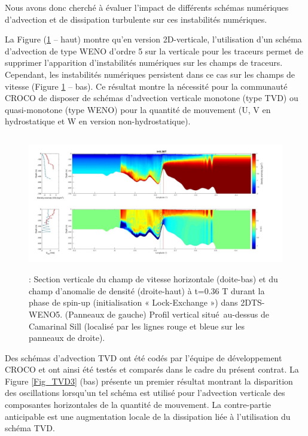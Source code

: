 Nous avons donc cherché à évaluer l'impact de différents schémas numériques d’advection et de dissipation turbulente sur ces instabilités numériques. 

\noindent La Figure (\ref{Fig_TVD2} – haut) montre qu'en version 2D-verticale, l’utilisation d’un schéma d’advection de type WENO d’ordre 5 sur la verticale pour les traceurs permet de supprimer l’apparition d’instabilités numériques sur les champs de traceurs. Cependant, les instabilités numériques persistent dans ce cas sur les champs de vitesse (Figure \ref{Fig_TVD2} – bas). Ce résultat montre la nécessité pour la communauté CROCO de disposer de schémas d’advection verticale monotone (type TVD) ou quasi-monotone (type WENO) pour la quantité de mouvement (U, V en hydrostatique et W en version non-hydrostatique). 

\begin{figure}[!h]
	\begin{Center}
		\includegraphics[width=4.98in,height=2.35in]{./media/TVD2.jpeg}
		\caption{ : Section verticale du champ de vitesse horizontale (doite-bas) et du champ d’anomalie de densité (droite-haut) à t=0.36 T durant la phase de spin-up (initialisation « Lock-Exchange ») dans 2DTS-WENO5. (Panneaux de gauche) Profil vertical situé\  au-dessus de Camarinal Sill (localisé par les lignes rouge et bleue sur les panneaux de droite).}
		\label{Fig_TVD2}
	\end{Center}
\end{figure}

\noindent Des schémas d’advection TVD ont été codés par l'équipe de développement CROCO et ont ainsi été testés et comparés dans le cadre du présent contrat. La Figure \ref{Fig_TVD3} (bas) présente un premier résultat montrant la disparition des oscillations lorsqu’un tel schéma est utilisé pour l’advection verticale des composantes horizontales de la quantité de mouvement. La contre-partie anticipable est une augmentation locale de la dissipation liée à l'utilisation du schéma TVD.

